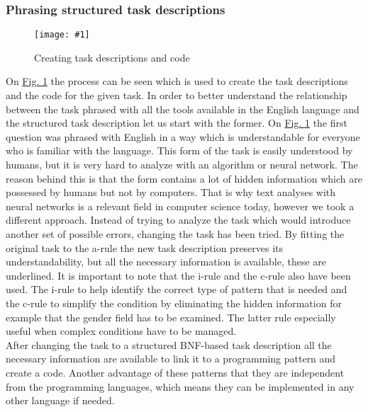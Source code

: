\documentclass[12pt]{article}
\newcommand{\refThis}[2]{\hyperref[#1]{#2 \ref{#1}}}
\newcommand{\insertPic}[3]
{   %
        \begin{figure}[h!]				
        \centering							
        \texttt{[image: \#1]}
        \caption{#3}						
        \label{fig:#1}						
        \end{figure}		
}
\begin{document}
    \subsubsection{Phrasing structured task descriptions}
    \insertPic{task}{0.3}{Creating task descriptions and code}
    On \refThis{fig:task}{Fig.} the process can be seen which is used to create the task descriptions and the code for the given task. In order to better understand the relationship between the task phrased with all the tools available in the English language and the structured task description let us start with the former. On \refThis{fig:task}{Fig.} the first question was phrased with English in a way which is understandable for everyone who is familiar with the language. This form of the task is easily understood by humans, but it is very hard to analyze with an algorithm or neural network. The reason behind this is that the form contains a lot of hidden information which are possessed by humans but not by computers. That is why text analyses with neural networks\cite{text1, text2} is a relevant field in computer science today, however we took a different approach. Instead of trying to analyze the task which would introduce another set of possible errors, changing the task has been tried. By fitting the original task to the a-rule the new task description preserves its understandability, but all the necessary information is available, these are underlined. It is important to note that the i-rule and the c-rule also have been used. The i-rule to help identify the correct type of pattern that is needed and the c-rule to simplify the condition by eliminating the hidden information for example that the gender field has to be examined. The latter rule especially useful when complex conditions have to be managed.\\
    After changing the task to a structured BNF-based task description all the necessary information are available to link it to a programming pattern and create a code. Another advantage of these patterns that they are independent from the programming languages, which means they can be implemented in any other language if needed.
    
\end{document}
